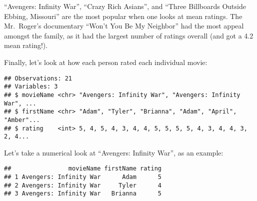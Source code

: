\documentclass[]{article}
\newenvironment{Shaded}{\begin{snugshade}}{\end{snugshade}}
\newcommand{\KeywordTok}[1]{\textcolor[rgb]{0.13,0.29,0.53}{\textbf{#1}}}
\newcommand{\DataTypeTok}[1]{\textcolor[rgb]{0.13,0.29,0.53}{#1}}
\newcommand{\StringTok}[1]{\textcolor[rgb]{0.31,0.60,0.02}{#1}}
\newcommand{\CommentTok}[1]{\textcolor[rgb]{0.56,0.35,0.01}{\textit{#1}}}
\newcommand{\OperatorTok}[1]{\textcolor[rgb]{0.81,0.36,0.00}{\textbf{#1}}}
\newcommand{\NormalTok}[1]{#1}
\begin{document}
``Avengers: Infinity War'', ``Crazy Rich Asians'', and ``Three
Billboards Outside Ebbing, Missouri'' are the most popular when one
looks at mean ratings. The Mr.~Roger's documentary ``Won't You Be My
Neighbor'' had the most appeal amongst the family, as it had the largest
number of ratings overall (and got a 4.2 mean rating!).

Finally, let's look at how each person rated each individual movie:

\begin{Shaded}
\end{Shaded}

\begin{verbatim}
## Observations: 21
## Variables: 3
## $ movieName <chr> "Avengers: Infinity War", "Avengers: Infinity War", ...
## $ firstName <chr> "Adam", "Tyler", "Brianna", "Adam", "April", "Amber"...
## $ rating    <int> 5, 4, 5, 4, 3, 4, 4, 5, 5, 5, 5, 4, 3, 4, 4, 3, 2, 4...
\end{verbatim}

Let's take a numerical look at ``Avengers: Infinity War'', as an
example:

\begin{Shaded}
\end{Shaded}

\begin{verbatim}
##                movieName firstName rating
## 1 Avengers: Infinity War      Adam      5
## 2 Avengers: Infinity War     Tyler      4
## 3 Avengers: Infinity War   Brianna      5
\end{verbatim}
\end{document}
